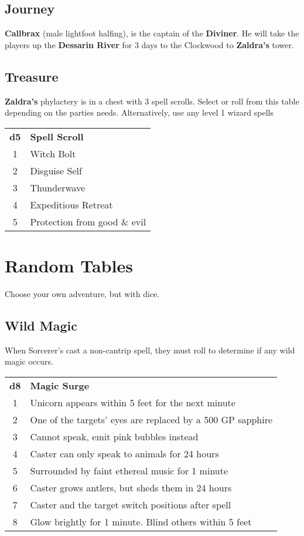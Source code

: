 \documentclass{dm}
\begin{document}
\begin{cols}
  \subsection{Journey}
    \textbf{Callbrax} (male lightfoot halfing), is the captain of the \textbf{Diviner}.
    He will take the players up the \textbf{Dessarin River} for 3 days to the Clockwood to \textbf{Zaldra's} tower.

  \subsection{Treasure}
    \textbf{Zaldra's} phylactery is in a chest with 3 spell scrolls.
    Select or roll from this table depending on the parties needs.
    Alternatively, use any level 1 wizard spells
    \begin{tabularz}
      \begin{tabularx}{\linewidth}{cX}
        \textbf{d5}  & \textbf{Spell Scroll} \\
        1 & Witch Bolt \\
        2 & Disguise Self \\
        3 & Thunderwave \\
        4 & Expeditious Retreat \\
        5 & Protection from good \& evil \\
      \end{tabularx}
    \end{tabularz}

  \section{Random Tables}
    Choose your own adventure, but with dice.

    \subsection{Wild Magic}
    When Sorcerer's cast a non-cantrip spell, they must roll to determine if any wild magic occurs.
    \begin{tabularz}
      \begin{tabularx}{\linewidth}{cX}
        \textbf{d8}  & \textbf{Magic Surge} \\
        1 & Unicorn appears within 5 feet for the next minute \\
        2 & One of the targets' eyes are replaced by a 500 GP sapphire \\
        3 & Cannot speak, emit pink bubbles instead \\
        4 & Caster can only speak to animals for 24 hours \\
        5 & Surrounded by faint ethereal music for 1 minute \\
        6 & Caster grows antlers, but sheds them in 24 hours \\
        7 & Caster and the target switch positions after spell \\
        8 & Glow brightly for 1 minute. Blind others within 5 feet \\
      \end{tabularx}
    \end{tabularz}

  \end{cols}
\end{document}
